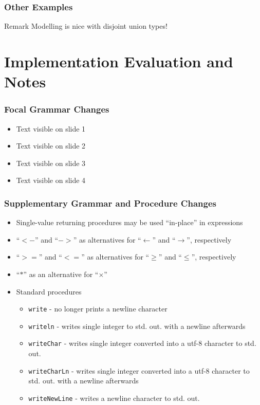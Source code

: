 \documentclass{beamer}
\begin{document}
\begin{frame}
\frametitle{Other Examples}
    
\usebox{\exampleImagination}

\begin{block}{Remark}
Modelling is nice with disjoint union types!
\end{block}
\end{frame}

\section{Implementation Evaluation and Notes}

\begin{frame}
\frametitle{Focal Grammar Changes}

\begin{itemize}
 \item<1-> Text visible on slide 1
 \item<2-> Text visible on slide 2
 \item<3-> Text visible on slide 3
 \item<4-> Text visible on slide 4
\end{itemize}

\end{frame}


\begin{frame}
\frametitle{Supplementary Grammar and Procedure Changes}

\begin{itemize}
 \item<1-> Single-value returning procedures may be used ``in-place'' in expressions
 \item<2-> ``$<-$'' and ``$->$'' as alternatives for ``$\leftarrow$'' and ``$\rightarrow$'', respectively
 \item<3-> ``$>=$'' and ``$<=$'' as alternatives for ``$\geq$'' and ``$\leq$'', respectively
 \item<4-> ``$*$'' as an alternative for ``$\times$''
 \item<5-> Standard procedures
 \begin{itemize}
  \item \texttt{write} - no longer prints a newline character
  \item \texttt{writeln} - writes single integer to std. out. with a newline afterwards
  \item \texttt{writeChar} - writes single integer converted into a utf-8 character to std. out.
  \item \texttt{writeCharLn} - writes single integer converted into a utf-8 character to std. out. with a newline afterwards
  \item \texttt{writeNewLine} - writes a newline character to std. out.
 \end{itemize}
\end{itemize}

\end{frame}
\end{document}
